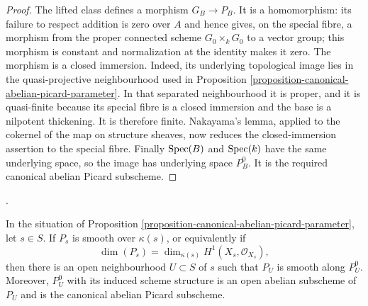 \begin{proof}
The lifted class defines a morphism $G_B \to P_B$. It is a homomorphism: its
failure to respect addition is zero over $A$ and hence gives, on the special
fibre, a morphism from the proper connected scheme $G_0 \times_k G_0$ to a
vector group; this morphism is constant and normalization at the identity
makes it zero. The morphism is a closed immersion. Indeed, its underlying
topological image lies in the quasi-projective neighbourhood used in
Proposition \ref{proposition-canonical-abelian-picard-parameter}. In that
separated neighbourhood it is proper, and it is quasi-finite because its
special fibre is a closed immersion and the base is a nilpotent thickening.
It is therefore finite. Nakayama's lemma, applied to the cokernel of the map
on structure sheaves, now reduces the closed-immersion assertion to the
special fibre. Finally $\mathop{\mathrm{Spec}}(B)$ and $\mathop{\mathrm{Spec}}(k)$ have the same underlying
space, so the image has underlying space $P_B^0$. It is the required canonical
abelian Picard subscheme.
\end{proof}

\begin{theorem}
\label{theorem-picard-smooth-near-smooth-fibre}
\begin{reference}
\cite[Expos\'e 236, Theorem 3.5, pp. 239--240]{FGA}.
\end{reference}
In the situation of Proposition
\ref{proposition-canonical-abelian-picard-parameter}, let $s \in S$. If
$P_s$ is smooth over $\kappa(s)$, or equivalently if
$$
\dim(P_s)=\dim_{\kappa(s)}H^1(X_s,\mathcal{O}_{X_s}),
$$
then there is an open neighbourhood $U \subset S$ of $s$ such that $P_U$ is
smooth along $P_U^0$. Moreover, $P_U^0$ with its induced scheme structure is
an open abelian subscheme of $P_U$ and is the canonical abelian Picard
subscheme.
\end{theorem}

